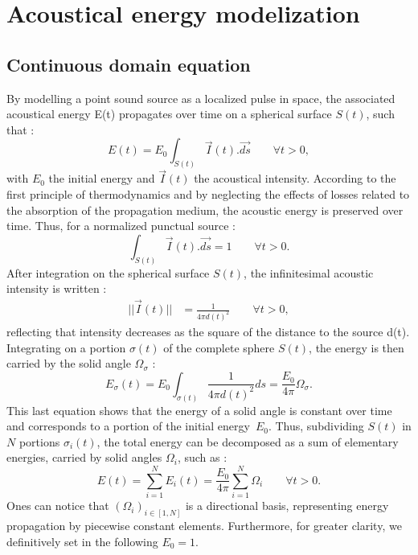 \documentclass[AMA,STIX1COL]{WileyNJD-v2}
\begin{document}
\section{Acoustical energy modelization}\label{sec2}
\subsection{Continuous domain equation}

By modelling a point sound source as a localized pulse in space, the associated acoustical energy E(t) propagates \cite{jouhaneau} over time on a spherical surface $S(t)$, such that :
%
\begin{equation} 
E(t) = E_0 \int_{S(t)} \overrightarrow{I}(t).\overrightarrow{ds} \qquad \forall t > 0,
\end{equation}
%
with $E_0$ the initial energy and $\overrightarrow{I}(t)$ the acoustical intensity. According to the first principle of thermodynamics and by neglecting the effects of losses related to the absorption of the propagation medium, the acoustic energy is preserved over time. Thus, for a normalized punctual source :
%
\begin{equation} 
\int_{S(t)} \overrightarrow{I}(t).\overrightarrow{ds} = 1 \qquad \forall t > 0.
\label{eq_2}
\end{equation}
%
After integration on the spherical surface $S(t)$, the infinitesimal acoustic intensity is written :
\begin{align} 
|| \overrightarrow{I}(t) || &= \frac{1}{4\pi d(t)^2} \qquad \forall t > 0,
\end{align}
%
reflecting that intensity decreases as the square of the distance to the source d(t). Integrating on a portion $\sigma(t)$ of the complete sphere $S(t)$, the energy is then carried by the solid angle $\Omega_{\sigma}$ :
%
\begin{equation}
E_{\sigma}(t) = E_0 \int_{\sigma(t)}  \frac{1}{4\pi  d(t)^2} ds = \frac{E_0}{4\pi}  \Omega_{\sigma}.
\label{eq_4}
\end{equation}
%
This last equation shows that the energy of a solid angle is constant over time and corresponds to a portion of the initial energy~$E_0$. Thus, subdividing $S(t)$ in $N$ portions $\sigma_i(t)$, the total energy can be decomposed as a sum of elementary energies, carried by solid angles $\Omega_i$, such as : 
%
\begin{equation}
E(t) = \sum_{i=1}^N E_i(t) = \frac{E_0}{4\pi}  \sum_{i=1}^N \Omega_i  \qquad \forall t > 0.
\label{eq_5}
\end{equation}
Ones can notice that $(\Omega_i)_{i\in[1,N] }$ is a directional basis, representing energy propagation by piecewise constant elements. Furthermore, for greater clarity, we definitively set in the following $E_0 = 1$.
\end{document}
